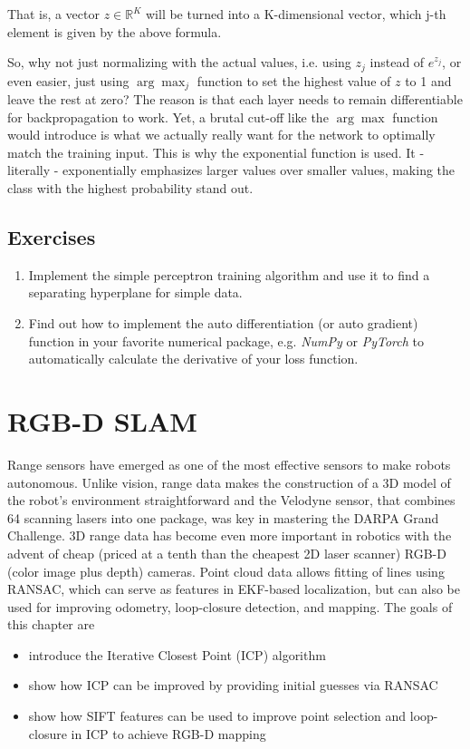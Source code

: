 \documentclass[paper=6.14in:9.21in,pagesize=pdftex,11pt,twoside,openright]{scrbook}
\begin{document}
That is, a vector $z \in \mathbb{R}^K$ will be turned into a K-dimensional vector, which j-th element is given by the above formula.

So, why not just normalizing with the actual values, i.e. using $z_j$ instead of $e^{z_j}$, or even easier, just using $\arg \max_j$ function to set the highest value of $z$ to 1 and leave the rest at zero? The reason is that each layer needs to remain differentiable for backpropagation to work. Yet, a brutal cut-off like the $\arg \max$ function would introduce is what we actually really want for the network to optimally match the training input. This is why the exponential function is used. It - literally - exponentially emphasizes larger values over smaller values, making the class with the highest probability stand out.


\section{Exercises}
\begin{enumerate}
\item Implement the simple perceptron training algorithm and use it to find a separating hyperplane for simple data.
\item Find out how to implement the auto differentiation (or auto gradient) function in your favorite numerical package, e.g. \emph{NumPy} or \emph{PyTorch} to automatically calculate the derivative of your loss function.
\end{enumerate}


\chapter{RGB-D SLAM} 
 Range sensors have emerged as one of the most effective sensors to make robots autonomous. Unlike vision, range data makes the construction of a 3D model of the robot's environment straightforward and the Velodyne sensor, that combines 64 scanning lasers into one package, was key in mastering the DARPA Grand Challenge.  3D range data has become even more important in robotics with the advent of cheap (priced at a tenth than the cheapest 2D laser scanner) RGB-D (color image plus depth) cameras. Point cloud data allows fitting of lines using RANSAC, which can serve as features in EKF-based localization, but can also be used for improving odometry, loop-closure detection, and mapping. The goals of this chapter are
\begin{itemize}
\item introduce the Iterative Closest Point (ICP) algorithm
\item show how ICP can be improved by providing initial guesses via RANSAC
\item show how SIFT features can be used to improve point selection and loop-closure in ICP to achieve RGB-D mapping
\end{itemize}
\end{document}
